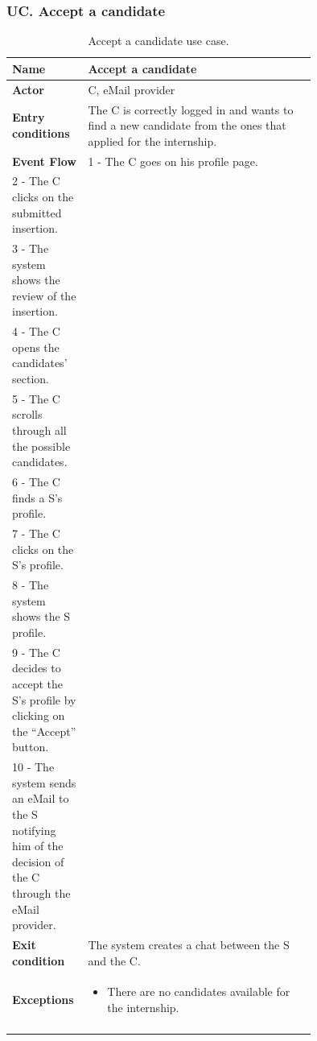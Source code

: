 \subsubsection*{UC\cuc . Accept a candidate}
\begin{center}
    \begin{longtable}{|l|p{0.75\linewidth}|}
        \hline
        \textbf{Name}               & Accept a candidate\\
        \hline
        \textbf{Actor}              & C, eMail provider\\
        \hline
        \textbf{Entry conditions}   & The C is correctly logged in and wants to find a new candidate from the ones that applied for the internship.\\
        \hline
        \textbf{Event Flow}         & 
        1 - The C goes on his profile page. \\
        2 - The C clicks on the submitted insertion. \\
        3 - The system shows the review of the insertion. \\
        4 - The C opens the candidates’ section. \\
        5 - The C scrolls through all the possible candidates. \\
        6 - The C finds a S’s profile. \\
        7 - The C clicks on the S’s profile. \\
        8 - The system shows the S profile. \\
        9 - The C decides to accept the S’s profile by clicking on the “Accept” button. \\
        10 - The system sends an eMail to the S notifying him of the decision of the C through the eMail provider. \\
        \hline
        \textbf{Exit condition}   & The system creates a chat between the S and the C. \\       
        \hline
        \textbf{Exceptions}       & \begin{itemize}
            \item There are no candidates available for the internship.
        \end{itemize}\\
        \hline
        \caption{Accept a candidate use case.}
        \label{tab: accept_a_candidate_use_case}
    \end{longtable}
\end{center}


